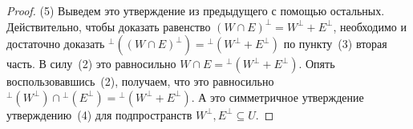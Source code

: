 \begin{proof}
(5) Выведем это утверждение из предыдущего с помощью остальных. Действительно, чтобы доказать равенство $(W\cap E)^\bot = W^\bot + E^\bot$, необходимо и достаточно доказать ${}^\bot((W\cap E)^\bot) = {}^\bot(W^\bot + E^\bot)$ по пункту~(3) вторая часть. В силу~(2) это равносильно $W\cap E = {}^\bot(W^\bot+E^\bot)$. Опять воспользовавшись~(2), получаем, что это равносильно ${}^\bot(W^\bot) \cap {}^\bot(E^\bot) = {}^\bot(W^\bot + E^\bot)$. А это симметричное утверждение утверждению~(4) для подпространств $W^\bot,E^\bot\subseteq U$.

\end{proof}
